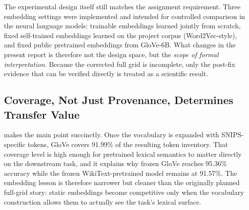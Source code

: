 \documentclass[10pt,a4paper]{article}
\begin{document}
The experimental design itself still matches the assignment requirement. Three embedding settings were implemented and intended for controlled comparison in the neural language models: trainable embeddings learned jointly from scratch, fixed self-trained embeddings learned on the project corpus (Word2Vec-style), and fixed public pretrained embeddings from GloVe-6B. What changes in the present report is therefore not the design space, but the \emph{scope of formal interpretation}. Because the corrected full grid is incomplete, only the post-fix evidence that can be verified directly is treated as a scientific result.

\subsection{Coverage, Not Just Provenance, Determines Transfer Value}
\label{sec:part2_coverage}

 makes the main point succinctly. Once the vocabulary is expanded with SNIPS-specific tokens, GloVe covers 91.99\% of the resulting token inventory. That coverage level is high enough for pretrained lexical semantics to matter directly on the downstream task, and it explains why frozen GloVe reaches 95.36\% accuracy while the frozen WikiText-pretrained model remains at 91.57\%. The embedding lesson is therefore narrower but cleaner than the originally planned full-grid story: static embeddings become competitive only when the vocabulary construction allows them to actually see the task's lexical surface.
\end{document}
